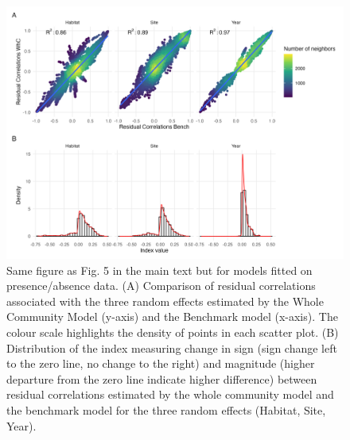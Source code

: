 \begin{figure}
\hypertarget{fig:chapt1supp30}{%
\centering
\includegraphics{03-Chapitre1/figures/supplementary/fig_supp29.png}
\caption{Same figure as Fig. 5 in the main text but for models fitted on
presence/absence data. (A) Comparison of residual correlations
associated with the three random effects estimated by the Whole
Community Model (y-axis) and the Benchmark model (x-axis). The colour
scale highlights the density of points in each scatter plot. (B)
Distribution of the index measuring change in sign (sign change left to
the zero line, no change to the right) and magnitude (higher departure
from the zero line indicate higher difference) between residual
correlations estimated by the whole community model and the benchmark
model for the three random effects (Habitat, Site,
Year).}\label{fig:chapt1supp30}
}
\end{figure}


\let\sectionmark\oldsectionmark

\captionsetup[figure]{list=yes}
\captionsetup[table]{list=yes}

\renewcommand{\thefigure}{\arabic{figure}}
\renewcommand{\thetable}{\arabic{table}}   


